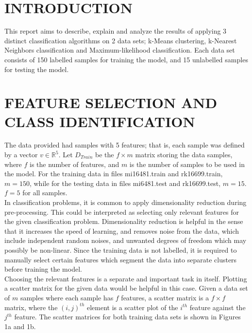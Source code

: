 \section{\label{sec:level1}INTRODUCTION}

\begin{flushleft}
This report aims to describe, explain and analyze the results of applying 3 distinct classification algorithms on 2 data sets; k-Means clustering, k-Nearest Neighbors classification and Maximum-likelihood classification. Each data set consists of 150 labelled samples for training the model, and 15 unlabelled samples for testing the model.
\end{flushleft}

\section{\label{sec:level2}FEATURE SELECTION AND CLASS IDENTIFICATION}
\begin{flushleft}
The data provided had samples with 5 features; that is, each sample was defined by a vector $v \in \mathbb{R}^5$. Let $D_{Train}$ be the $f \times m$ matrix storing the data samples, where $f$ is the number of features, and $m$ is the number of samples to be used in the model. 
For the training data in files mi16481.train and rk16699.train, $m=150$, while for the testing data in files mi6481.test and rk16699.test, $m=15$. $f=5$ for all samples.
\\ \vspace{5mm}
In classification problems, it is common to apply dimensionality reduction during pre-processing. This could be interpreted as selecting only relevant features for the given classification problem. Dimensionality reduction is helpful in the sense that it increases the speed of learning, and removes noise from the data, which include independent random noises, and unwanted degrees of freedom which may possibly be non-linear. \cite{dimensions}  Since the training data is not labelled, it is
required to manually select certain features which segment the data into separate clusters before training the model.
\\ \vspace{5mm}
Choosing the relevant features is a separate and important task in itself. Plotting a scatter matrix for the given data would be helpful in this case. Given a data set of $m$ samples where each sample has $f$ features, a scatter matrix is a $f \times f$ matrix, where the $(i,j)^{th}$ element is a scatter plot of the $i^{th}$ feature against the $j^{th}$ feature. The scatter matrices for both training data sets is shown in Figures 1a and 1b.
\end{flushleft}
 
